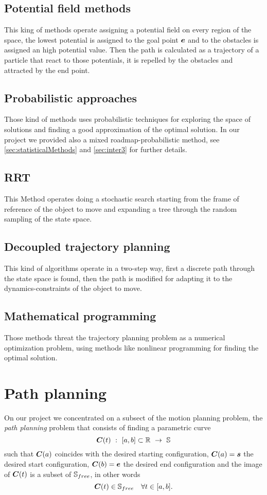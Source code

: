 \documentclass[dissertation.tex]{subfiles}
\begin{document}
\subsection{Potential field methods}
This king of methods operate assigning a potential field on every
region of the space, the lowest potential is assigned to the goal
point $\boldsymbol{e}$ and to the obstacles is assigned an high potential
value. Then the path is calculated as a trajectory of a particle that
react to those potentials, it is repelled by the obstacles and
attracted by the end point.

\subsection{Probabilistic approaches}
Those kind of methods uses probabilistic techniques for exploring the
space of solutions and finding a good approximation of the optimal
solution. In our project we provided also a mixed
roadmap-probabilistic method, see \cref{sec:statisticalMethods} and
\cref{sec:inter3} for further details.

\subsection{\acf{RRT}}
This Method operates doing a stochastic search starting from the frame
of reference of the object to move and expanding a tree through the
random sampling of the state space.

\subsection{Decoupled trajectory planning}
This kind of algorithms operate in a two-step way, first a discrete
path through the state space is found, then the path is modified for
adapting it to the dynamics-constraints of the object to move.

\subsection{Mathematical programming}
Those methods threat the trajectory planning problem as a numerical
optimization problem, using methods like nonlinear programming for
finding the optimal solution.

\section{Path planning}
On our project we concentrated on a subsect of the motion planning
problem, the \emph{path planning} problem that consists \cite{choset}
of finding a parametric curve
\begin{equation*}
  \ve{C}(t)\ :\ [a,b]\subset\mR\ \rightarrow\ \mS
\end{equation*}
such that $\boldsymbol{C}(a)$ coincides with the desired starting
configuration, $\boldsymbol{C}(a)=\boldsymbol{s}$ the desired start configuration,
$\boldsymbol{C}(b)=\boldsymbol{e}$ the desired end configuration and the image of
$\boldsymbol{C}(t)$ is a
subset of $\mathbb{S}_{free}$, in other words
\begin{equation*}
\boldsymbol{C}(t)\in\mathbb{S}_{free}\quad \forall t\in[a,b].
\end{equation*}
\end{document}
